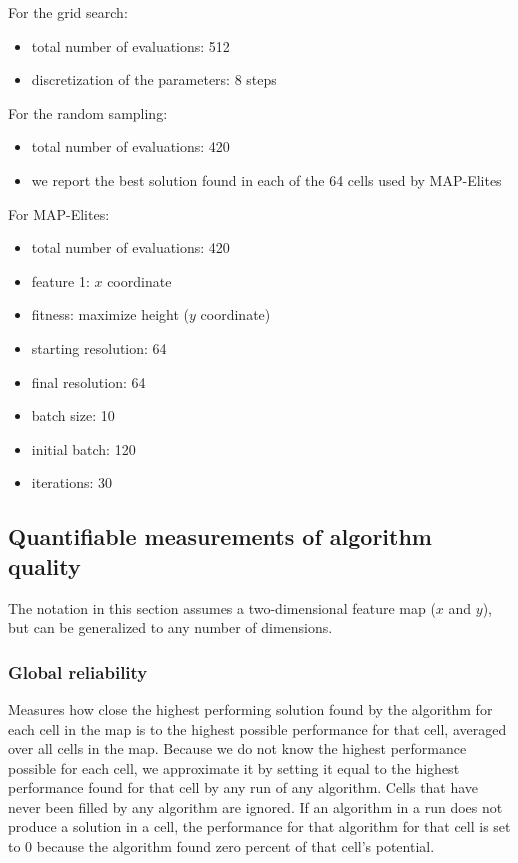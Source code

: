 \documentclass[twocolumn, DIV25, 9pt]{scrartcl}
\begin{document}
For the grid search:
\begin{itemize}
\item total number of evaluations: 512
\item discretization of the parameters: 8 steps
\end{itemize}

For the random sampling:
\begin{itemize}
\item total number of evaluations: 420
\item we report the best solution found in each of the 64 cells used by MAP-Elites
\end{itemize}

For MAP-Elites:
\begin{itemize}
\item total number of evaluations: 420
\item feature 1: $x$ coordinate
\item fitness: maximize height ($y$ coordinate)
\item starting resolution: 64
\item final resolution:  64
\item batch size: 10
\item initial batch: 120
\item iterations: 30
\end{itemize}

\subsection{Quantifiable measurements of algorithm quality}

The notation in this section assumes a two-dimensional feature map ($x$ and $y$), but can be generalized to any number of dimensions.


\subsubsection{Global reliability} 
\label{methodsGlobalReliability}

Measures how close the highest performing solution found by the algorithm for each cell in the map is to the highest possible performance for that cell, averaged over all cells in the map. Because we do not know the highest performance possible for each cell, we approximate it by setting it equal to the highest performance found for that cell by any run of any algorithm. Cells that have never been filled by any algorithm are ignored. If an algorithm in a run does not produce a solution in a cell, the performance for that algorithm for that cell is set to 0 because the algorithm found zero percent of that cell's potential. 
\end{document}
